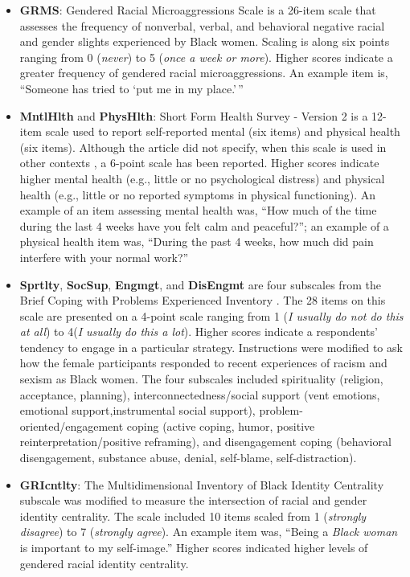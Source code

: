 \documentclass[
  11pt,
]{book}
\begin{document}
\begin{itemize}
\item
  \textbf{GRMS}: Gendered Racial Microaggressions Scale \citep{lewis_construction_2015} is a 26-item scale that assesses the frequency of nonverbal, verbal, and behavioral negative racial and gender slights experienced by Black women. Scaling is along six points ranging from 0 (\emph{never}) to 5 (\emph{once a week or more}). Higher scores indicate a greater frequency of gendered racial microaggressions. An example item is, ``Someone has tried to `put me in my place.'\,''
\item
  \textbf{MntlHlth} and \textbf{PhysHlth}: Short Form Health Survey - Version 2 \citep{ware_comparison_1995} is a 12-item scale used to report self-reported mental (six items) and physical health (six items). Although the article did not specify, when this scale is used in other contexts \citep[e.g.,][]{kim_racial_2017}, a 6-point scale has been reported. Higher scores indicate higher mental health (e.g., little or no psychological distress) and physical health (e.g., little or no reported symptoms in physical functioning). An example of an item assessing mental health was, ``How much of the time during the last 4 weeks have you felt calm and peaceful?''; an example of a physical health item was, ``During the past 4 weeks, how much did pain interfere with your normal work?''
\item
  \textbf{Sprtlty}, \textbf{SocSup}, \textbf{Engmgt}, and \textbf{DisEngmt} are four subscales from the Brief Coping with Problems Experienced Inventory \citep{carver_you_1997}. The 28 items on this scale are presented on a 4-point scale ranging from 1 (\emph{I usually do not do this at all}) to 4(\emph{I usually do this a lot}). Higher scores indicate a respondents' tendency to engage in a particular strategy. Instructions were modified to ask how the female participants responded to recent experiences of racism and sexism as Black women. The four subscales included spirituality (religion, acceptance, planning), interconnectedness/social support (vent emotions, emotional support,instrumental social support), problem-oriented/engagement coping (active coping, humor, positive reinterpretation/positive reframing), and disengagement coping (behavioral disengagement, substance abuse, denial, self-blame, self-distraction).
\item
  \textbf{GRIcntlty}: The Multidimensional Inventory of Black Identity Centrality subscale \citep{sellers_multidimensional_nodate} was modified to measure the intersection of racial and gender identity centrality. The scale included 10 items scaled from 1 (\emph{strongly disagree}) to 7 (\emph{strongly agree}). An example item was, ``Being a \emph{Black woman} is important to my self-image.'' Higher scores indicated higher levels of gendered racial identity centrality.
\end{itemize}
\end{document}
